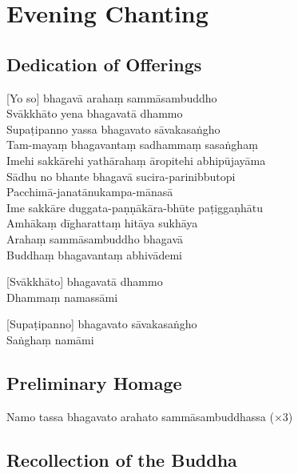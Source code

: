 \chapter{Evening Chanting}

\section*{Dedication of Offerings}


[Yo so] bhagavā arahaṃ sammāsambuddho\\
Svākkhāto yena bhagavatā dhammo\\
Supaṭipanno yassa bhagavato sāvakasaṅgho\\
Tam-mayaṃ bhagavantaṃ sadhammaṃ sasaṅghaṃ\\
Imehi sakkārehi yathārahaṃ āropitehi abhipūjayāma\\
Sādhu no bhante bhagavā sucira-parinibbutopi\\
Pacchimā-janatānukampa-mānasā\\
Ime sakkāre duggata-paṇṇākāra-bhūte paṭiggaṇhātu\\
Amhākaṃ dīgharattaṃ hitāya sukhāya\\
Arahaṃ sammāsambuddho bhagavā\\
Buddhaṃ bhagavantaṃ abhivādemi

[Svākkhāto] bhagavatā dhammo\\
Dhammaṃ namassāmi

[Supaṭipanno] bhagavato sāvakasaṅgho\\
Saṅghaṃ namāmi

\section*{Preliminary Homage}

\begin{leader}
\end{leader}

Namo tassa bhagavato arahato sammāsambuddhassa (×3)

\section*{Recollection of the Buddha}

\begin{leader}
\end{leader}

